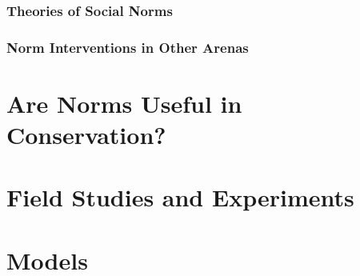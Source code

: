\documentclass[rutwik_proposal.tex]{subfiles}
\begin{document}
\subsection{Theories of Social Norms}\label{subsec:theories}
\subsection{Norm Interventions in Other Arenas}\label{subsec:interventions}

\chapter{Are Norms Useful in Conservation?}\label{ch:usefulness}

\chapter{Field Studies and Experiments}\label{ch:field}

\chapter{Models}\label{ch:models}
\end{document}
